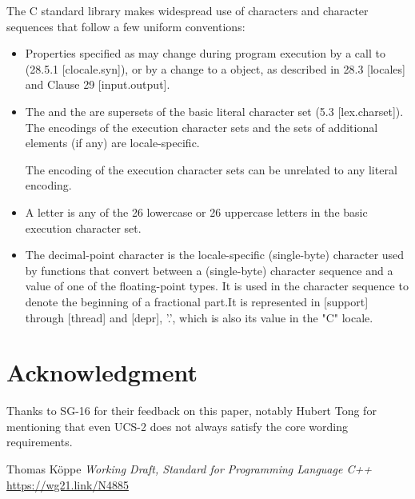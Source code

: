 \documentclass{wg21}
\begin{document}
The C standard library makes widespread use of characters and character sequences that follow a few uniform conventions:

\begin{itemize}
\item Properties specified as  may change during program execution by a call to  (28.5.1 [clocale.syn]), or by a change to a  object, as described in 28.3 [locales] and Clause 29 [input.output].
\item The  and the  are supersets of the basic literal character set (5.3 [lex.charset]). The encodings of the execution character sets and the sets of additional elements (if any) are locale-specific. 

\begin{note}
The encoding of the execution character sets can be unrelated to any literal encoding.
\end{note}

\item A letter is any of the 26 lowercase or 26 uppercase letters in the basic execution character set.

\item The decimal-point character is the locale-specific (single-byte) character used by functions that convert between a (single-byte) character sequence and a value of one of the floating-point types. It is used in the character sequence to denote the beginning of a fractional part.It is represented in [support] through [thread] and [depr], ’.’, which is also its value in the "C" locale.
\end{itemize}

\section{Acknowledgment}

Thanks to SG-16 for their feedback on this paper, notably Hubert Tong for mentioning that even UCS-2 does not always satisfy the core wording requirements.





\renewcommand{\section}[2]{}%
\begin{thebibliography}{9}
    Thomas Köppe
    \emph{Working Draft, Standard for Programming Language C++}\newline
    \url{https://wg21.link/N4885}
\end{thebibliography}
\end{document}
